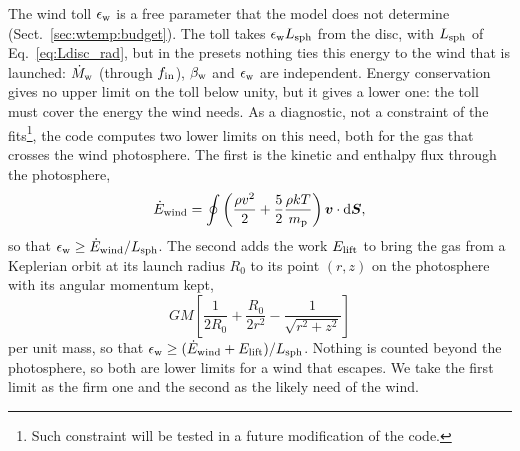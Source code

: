 The wind toll $\epsilon_{\rm w}$ is a free parameter that the model does not determine (Sect.~\ref{sec:wtemp:budget}).
The toll takes $\epsilon_{\rm w}L_{\rm sph}$ from the disc, with $L_{\rm sph}$ of Eq.~\eqref{eq:Ldisc_rad}, but in the  presets nothing ties this energy to the wind that is launched: $\dot M_{\rm w}$ (through $f_{\rm in}$), $\beta_{\rm w}$ and $\epsilon_{\rm w}$ are independent.
Energy conservation gives no upper limit on the toll below unity, but it gives a lower one: the toll must cover the energy the wind needs.
As a diagnostic, not a constraint of the fits\footnote{Such constraint will be tested in a future modification of the code.}, the code computes two lower limits on this need, both for the gas that crosses the wind photosphere.
The first is the kinetic and enthalpy flux through the photosphere,
\begin{equation}
\dot E_{\rm wind} = \oint \left(\frac{\rho v^2}{2} + \frac{5}{2}\frac{\rho kT}{m_{\rm p}}\right)\boldsymbol{v}\cdot{\rm d}\boldsymbol{S} ,
\label{eq:Edot_wind}
\end{equation}
so that $\epsilon_{\rm w} \ge \dot E_{\rm wind}/L_{\rm sph}$.
The second adds the work $E_{\rm lift}$ to bring the gas from a Keplerian orbit at its launch radius $R_0$ to its point $(r, z)$ on the photosphere with its angular momentum kept,
\begin{equation}
GM\left[\frac{1}{2R_0} + \frac{R_0}{2r^2} - \frac{1}{\sqrt{r^2 + z^2}}\right]
\label{eq:Elift}
\end{equation}
per unit mass, so that $\epsilon_{\rm w} \ge (\dot E_{\rm wind} + E_{\rm lift})/L_{\rm sph}$.
Nothing is counted beyond the photosphere, so both are lower limits for a wind that escapes.
We take the first limit as the firm one and the second as the likely need of the wind.
